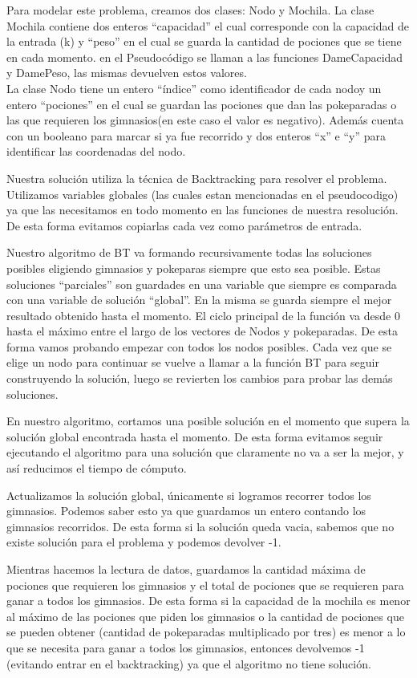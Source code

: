 \documentclass[spanish,12pt]{article}
\begin{document}
Para modelar este problema, creamos dos clases: Nodo y Mochila.
La clase Mochila contiene dos enteros ``capacidad'' el cual corresponde con la capacidad de la entrada (k) y ``peso'' en el cual se guarda la cantidad de pociones que se tiene en cada momento. 
en el Pseudocódigo se llaman a las funciones DameCapacidad y DamePeso, las mismas devuelven estos valores.
\\
La clase Nodo tiene  un entero ``índice'' como identificador de cada nodoy un entero ``pociones'' en el cual se guardan las pociones que dan las pokeparadas o las que requieren los gimnasios(en este caso el valor es negativo). Además cuenta con un booleano para marcar si ya fue recorrido y dos enteros ``x'' e ``y'' para identificar las coordenadas del nodo.

Nuestra solución utiliza la técnica de Backtracking para resolver el problema. Utilizamos variables globales (las cuales estan mencionadas en el pseudocodigo) ya que las necesitamos en todo momento en las funciones de nuestra resolución. De esta forma evitamos copiarlas cada vez como parámetros de entrada.

Nuestro algoritmo de BT va formando recursivamente todas las soluciones posibles eligiendo gimnasios y pokeparas siempre que esto sea posible. Estas soluciones ``parciales'' son guardades en una variable que siempre es comparada con una variable de solución ``global''. En la misma se guarda siempre el mejor resultado obtenido hasta el momento. El ciclo principal de la función va desde 0 hasta el máximo entre el largo de los vectores de Nodos y pokeparadas. De esta forma vamos probando empezar con todos los nodos posibles. Cada vez que se elige un nodo para continuar se vuelve a llamar a la función BT para seguir construyendo la solución, luego se revierten los cambios para probar las demás soluciones. 

En nuestro algoritmo, cortamos una posible solución en el momento que supera la solución global encontrada hasta el momento. De esta forma evitamos seguir ejecutando el algoritmo para una solución que claramente no va a ser la mejor, y así reducimos el tiempo de cómputo.

Actualizamos la solución global, únicamente si logramos recorrer todos los gimnasios. Podemos saber esto ya que guardamos un entero contando los gimnasios recorridos. De esta forma si la solución queda vacia, sabemos que no existe solución para el problema y podemos devolver -1.

Mientras hacemos la lectura de datos, guardamos la cantidad máxima de pociones que requieren los gimnasios y el total de pociones que se requieren para ganar a todos los gimnasios. De esta forma si la capacidad de la mochila es menor al máximo de las pociones que piden los gimnasios o la cantidad de pociones que se pueden obtener (cantidad de pokeparadas multiplicado por tres) es menor a lo que se necesita para ganar a todos los gimnasios, entonces devolvemos -1 (evitando entrar en el backtracking) ya que el algoritmo no tiene solución. 
\end{document}
